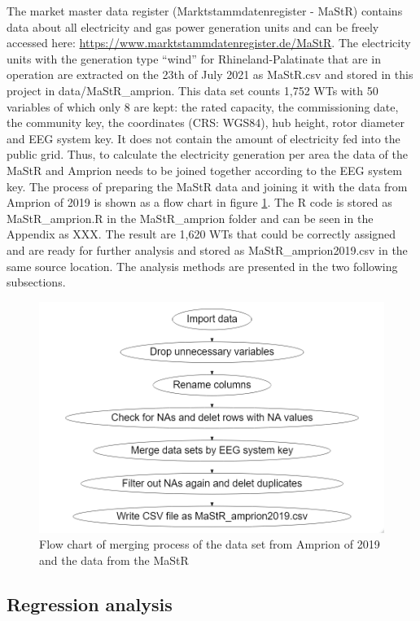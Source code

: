 \documentclass[a4paper,11pt]{article}
\begin{document}
The market master data register (Marktstammdatenregister - MaStR) contains data about all electricity and gas power generation units and can be freely accessed here: \href{https://www.marktstammdatenregister.de/MaStR/Einheit/Einheiten/OeffentlicheEinheitenuebersicht}{https://www.marktstammdatenregister.de/MaStR}. The electricity units with the generation type ``wind'' for Rhineland-Palatinate that are in operation are extracted on the 23th of July 2021 as MaStR.csv and stored in this project in data/MaStR\_amprion. This data set counts 1,752 WTs with 50 variables of which only 8 are kept: the rated capacity, the commissioning date, the community key, the coordinates (CRS: WGS84), hub height, rotor diameter and EEG system key. It does not contain the amount of electricity fed into the public grid. Thus, to calculate the electricity generation per area the data of the MaStR and Amprion needs to be joined together according to the EEG system key. The process of preparing the MaStR data and joining it with the data from Amprion of 2019 is shown as a flow chart in figure \ref{fig:merge}. The R code is stored as MaStR\_amprion.R in the MaStR\_amprion folder and can be seen in the Appendix as XXX. The result are 1,620 WTs that could be correctly assigned and are ready for further analysis and stored as MaStR\_amprion2019.csv in the same source location. The analysis methods are presented in the two following subsections.
\begin{figure}

{\centering \includegraphics[width=0.8\linewidth]{data/MaStR_amprion_join/mergeflow} 

}

\caption{Flow chart of merging process of the data set from Amprion of 2019 and the data from the MaStR}\label{fig:merge}
\end{figure}
\hypertarget{regression-analysis-1}{%
\subsection{Regression analysis}\label{regression-analysis-1}}
\end{document}
